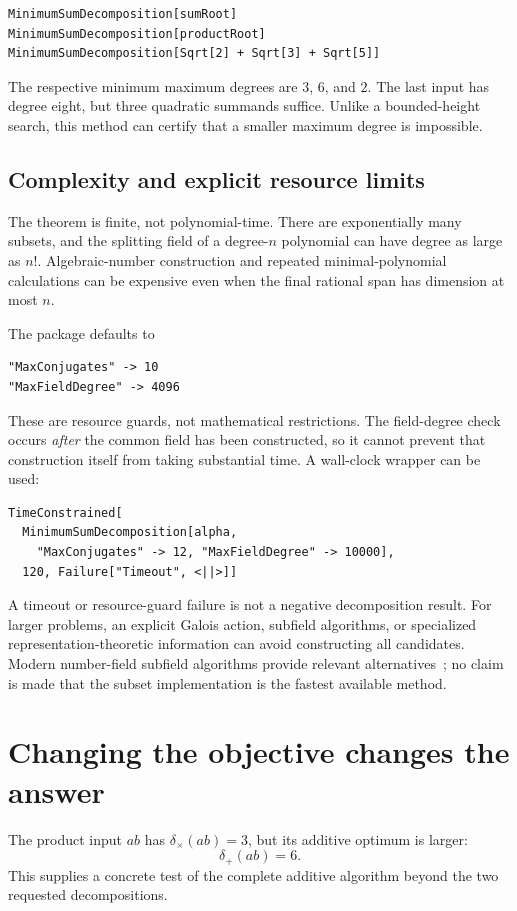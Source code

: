 \documentclass[11pt,letterpaper]{article}
\theoremstyle{definition}\newtheorem{definition}[theorem]{Definition}
\theoremstyle{remark}\newtheorem{remark}[theorem]{Remark}
\newcommand{\ds}{\delta_{+}}
\newcommand{\dm}{\delta_{\times}}
\begin{document}
\begin{lstlisting}
MinimumSumDecomposition[sumRoot]
MinimumSumDecomposition[productRoot]
MinimumSumDecomposition[Sqrt[2] + Sqrt[3] + Sqrt[5]]
\end{lstlisting}
The respective minimum maximum degrees are $3$, $6$, and $2$. The last input has degree eight, but three quadratic summands suffice. Unlike a bounded-height search, this method can certify that a smaller maximum degree is impossible.

\subsection{Complexity and explicit resource limits}
The theorem is finite, not polynomial-time. There are exponentially many subsets, and the splitting field of a degree-$n$ polynomial can have degree as large as $n!$. Algebraic-number construction and repeated minimal-polynomial calculations can be expensive even when the final rational span has dimension at most $n$.

The package defaults to
\begin{lstlisting}
"MaxConjugates" -> 10
"MaxFieldDegree" -> 4096
\end{lstlisting}
These are resource guards, not mathematical restrictions. The field-degree check occurs \emph{after} the common field has been constructed, so it cannot prevent that construction itself from taking substantial time. A wall-clock wrapper can be used:
\begin{lstlisting}
TimeConstrained[
  MinimumSumDecomposition[alpha,
    "MaxConjugates" -> 12, "MaxFieldDegree" -> 10000],
  120, Failure["Timeout", <||>]]
\end{lstlisting}
A timeout or resource-guard failure is not a negative decomposition result. For larger problems, an explicit Galois action, subfield algorithms, or specialized representation-theoretic information can avoid constructing all candidates. Modern number-field subfield algorithms provide relevant alternatives~\cite{subfields}; no claim is made that the subset implementation is the fastest available method.

\section{Changing the objective changes the answer}
\label{sec:cross}
The product input $ab$ has $\dm(ab)=3$, but its additive optimum is larger:
\begin{equation}
 \boxed{\ds(ab)=6.}
 \label{eq:crossanswer}
\end{equation}
This supplies a concrete test of the complete additive algorithm beyond the two requested decompositions.
\end{document}
